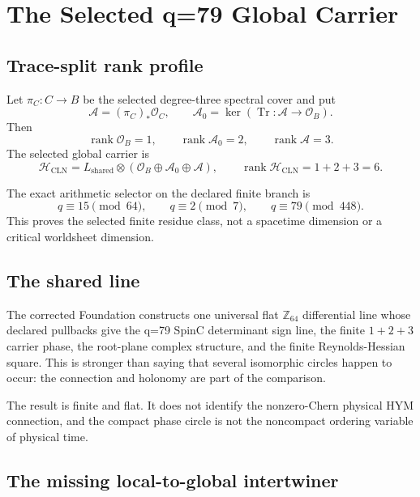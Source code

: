 \documentclass[11pt]{article}
\newcommand{\Hspace}{\mathcal H}
\newcommand{\Lshared}{L_{\mathrm{shared}}}
\newcommand{\Atrace}{\mathcal A_0}
\newcommand{\Acover}{\mathcal A}
\begin{document}
\section{The Selected q=79 Global Carrier}

\subsection{Trace-split rank profile}

Let $\pi_C:C\to B$ be the selected degree-three spectral cover and put
\[
 \Acover=(\pi_C)_*\mathcal O_C,\qquad
 \Atrace=\ker\!\left(\operatorname{Tr}:\Acover\to\mathcal O_B\right).
\]
Then
\[
 \operatorname{rank}\mathcal O_B=1,\qquad
 \operatorname{rank}\Atrace=2,\qquad
 \operatorname{rank}\Acover=3.
\]
The selected global carrier is
\[
 \Hspace_{\mathrm{CLN}}
 =
 \Lshared\otimes
 \left(\mathcal O_B\oplus\Atrace\oplus\Acover\right),
 \qquad
 \operatorname{rank}\Hspace_{\mathrm{CLN}}=1+2+3=6.
\]

The exact arithmetic selector on the declared finite branch is
\[
 q\equiv15\pmod{64},\qquad
 q\equiv2\pmod7,\qquad
 q\equiv79\pmod{448}.
\]
This proves the selected finite residue class, not a spacetime dimension or a
critical worldsheet dimension.

\subsection{The shared line}

The corrected Foundation constructs one universal flat
$\mathbb Z_{64}$ differential line whose declared pullbacks give the q=79
SpinC determinant sign line, the finite $1+2+3$ carrier phase, the root-plane
complex structure, and the finite Reynolds-Hessian square.  This is stronger
than saying that several isomorphic circles happen to occur: the connection
and holonomy are part of the comparison.

The result is finite and flat.  It does not identify the nonzero-Chern
physical HYM connection, and the compact phase circle is not the noncompact
ordering variable of physical time.

\subsection{The missing local-to-global intertwiner}
\end{document}

